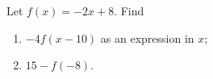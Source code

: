 Let $f(x)=-2x+8$. Find
\begin{enumerate}
\item[(a)] $-4f(x-10)$ as an expression in $x$;
\item[(b)] $15-f(-8)$.
\end{enumerate}
